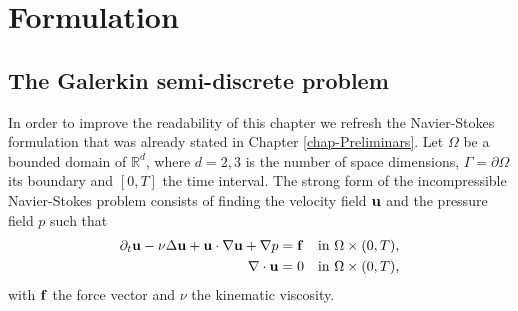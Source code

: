 

\section{Formulation}
\label{sec-formulation}
\subsection{The Galerkin semi-discrete problem}
\label{subsec-NS_formulation}
In order to improve the readability of this chapter we refresh the Navier-Stokes formulation that was already stated in Chapter \ref{chap-Preliminars}. 
Let $\Omega$ be a bounded domain of $\mathbb{R}^d$, where $d=2,3$ is the number of space dimensions, $\Gamma=\partial\Omega$ its boundary and $[0,T]$ the time interval. The strong form of the incompressible Navier-Stokes problem consists of finding the velocity field ${\bf u}$ and the pressure field $p$ such that 
\begin{align}
\label{eq-C4_NS_strong_mome}
\partial_t{\bf u}-\nu\Delta{\bf u}+{\bf u}\cdot\nabla{\bf u}+\nabla p&={\bf f}&\mbox{in $\Omega\times(0,T)$,}\\
\label{eq-C4_NS_strong_inc}
\nabla\cdot{\bf u}&=0&\mbox{in $\Omega\times(0,T)$,}
\end{align}
with ${\bf f}$ the force vector and $\nu$ the kinematic viscosity. 

